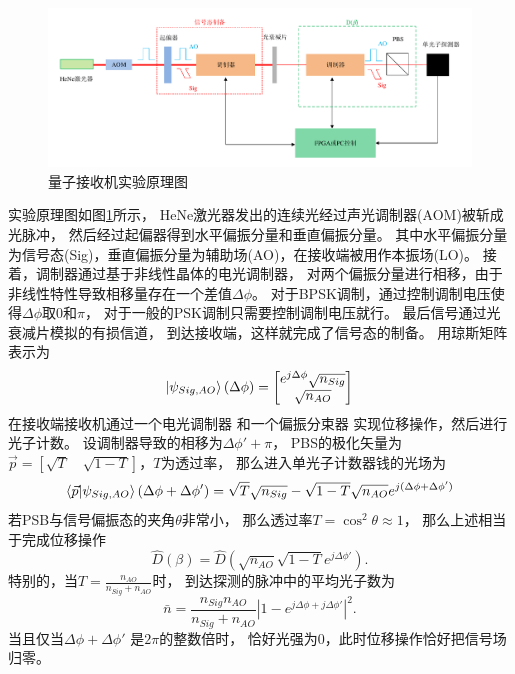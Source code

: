 \begin{figure}
\centering
  \includegraphics[width=\textwidth]{figures/chap5/experiment-schematic}
  \caption{量子接收机实验原理图}
  \label{fig:experiment-schematic}
\end{figure}



实验原理图如图\ref{fig:experiment-schematic}所示，
HeNe激光器发出的连续光经过声光调制器(AOM)被斩成光脉冲，
然后经过起偏器得到水平偏振分量和垂直偏振分量。
其中水平偏振分量为信号态(Sig)，垂直偏振分量为辅助场(AO)，在接收端被用作本振场(LO)。
接着，调制器通过基于非线性晶体的电光调制器，
对两个偏振分量进行相移，由于非线性特性导致相移量存在一个差值$\Delta \phi$。
对于BPSK调制，通过控制调制电压使得$\Delta \phi$取$0$和$\pi$，
对于一般的PSK调制只需要控制调制电压就行。
最后信号通过光衰减片模拟的有损信道，
到达接收端，这样就完成了信号态的制备。
用琼斯矩阵表示为
\begin{equation}
\ket{\psi_{Sig, AO}}(\Delta \phi) = \begin{bmatrix}
                            e^{j \Delta \phi}\sqrt{n_{Sig}} \\
                            \sqrt{n_{AO}} 
                        \end{bmatrix}
\end{equation}
在接收端接收机通过一个电光调制器
和一个偏振分束器
实现位移操作，然后进行光子计数。
设调制器导致的相移为$\Delta \phi' + \pi$，
PBS的极化矢量为$\vec{p} = [\sqrt{T} \quad \sqrt{1-T}]$，$T$为透过率，
那么进入单光子计数器钱的光场为
\begin{equation}
\bra{\vec{p}} \ket{\psi_{Sig, AO}}(\Delta \phi + \Delta \phi') \\
             =  \sqrt{T}\sqrt{n_{Sig}} - \sqrt{1-T}\sqrt{n_{AO}} e^{j(\Delta \phi + \Delta \phi')} 
\end{equation}
若PSB与信号偏振态的夹角$\theta$非常小，
那么透过率$T = \cos^2 \theta \approx 1$，
那么上述相当于完成位移操作
\begin{equation}
\hat{D}(\beta) = \hat{D}(\sqrt{n_{AO}}\sqrt{1-T} e^{j \Delta\phi'}).
\end{equation}
特别的，当$T = \frac{n_{AO}}{n_{Sig} + n_{AO}}$时，
到达探测的脉冲中的平均光子数为
\begin{equation}
\bar{n} = \frac{n_{Sig} n_{AO}}{n_{Sig} + n_{AO}} \left|1 - e^{j\Delta \phi + j \Delta \phi'} \right|^2.
\end{equation}
当且仅当$\Delta \phi + \Delta \phi'$ 是$2\pi$的整数倍时，
恰好光强为0，此时位移操作恰好把信号场归零。

